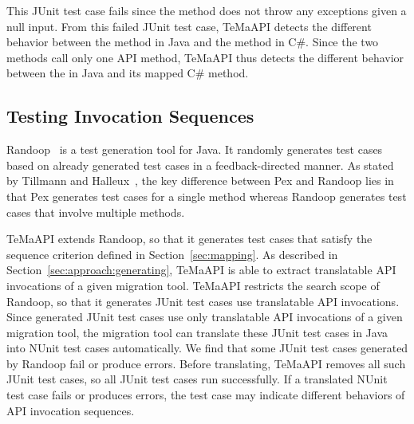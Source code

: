 This JUnit test case fails since the  method does not throw any exceptions given a null input.
From this failed JUnit test case, TeMaAPI detects the different behavior between the  method in Java and the  method in C\#. Since the two methods call only one API method, TeMaAPI thus detects the different behavior between the  in Java and its mapped C\# method.

\subsection{Testing Invocation Sequences}
\label{sec:approach:sequence}
Randoop~\cite{pacheco2007feedback} is a test generation tool for Java. It randomly generates test cases based on already generated test cases in a feedback-directed manner. As stated by Tillmann and Halleux~\cite{tillmann2008pex}, the key difference between Pex and Randoop lies in that Pex generates test cases for a single method whereas Randoop generates test cases that involve multiple methods.

TeMaAPI extends Randoop, so that it generates test cases that satisfy the sequence criterion defined in Section~\ref{sec:mapping}. As described in Section~\ref{sec:approach:generating}, TeMaAPI is able to extract translatable API invocations of a given migration tool. TeMaAPI restricts the search scope of Randoop, so that it generates JUnit test cases use translatable API invocations. Since generated JUnit test cases use only translatable API invocations of a given migration tool, the migration tool can translate these JUnit test cases in Java into NUnit test cases automatically. We find that some JUnit test cases generated by Randoop fail or produce errors. Before translating, TeMaAPI removes all such JUnit test cases, so all JUnit test cases run successfully. If a translated NUnit test case fails or produces errors, the test case may indicate different behaviors of API invocation sequences.




